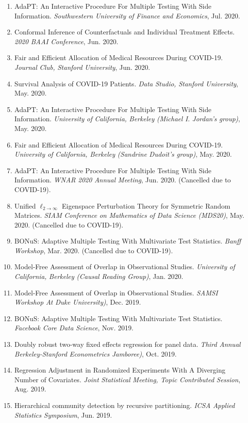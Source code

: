 \documentclass{article}
\begin{document}
\begin{enumerate}
\item AdaPT: An Interactive Procedure For Multiple Testing With Side Information. \emph{Southwestern University of Finance and Economics}, Jul. 2020. 
\item Conformal Inference of Counterfactuals and Individual Treatment Effects. \emph{2020 BAAI Conference}, Jun. 2020. 
\item Fair and Efficient Allocation of Medical Resources During COVID-19. \emph{Journal Club, Stanford University}, Jun. 2020.
\item Survival Analysis of COVID-19 Patients. \emph{Data Studio, Stanford University}, May. 2020.
\item AdaPT: An Interactive Procedure For Multiple Testing With Side Information. \emph{University of California, Berkeley (Michael I. Jordan's group)}, May. 2020. 
\item Fair and Efficient Allocation of Medical Resources During COVID-19. \emph{University of California, Berkeley (Sandrine Dudoit's group)}, May. 2020. 
\item AdaPT: An Interactive Procedure For Multiple Testing With Side Information. \emph{WNAR 2020 Annual Meeting}, Jun. 2020. (Cancelled due to COVID-19).
\item Unified $\ell_{2\rightarrow\infty}$ Eigenspace Perturbation Theory for Symmetric Random Matrices. \emph{SIAM Conference on Mathematics of Data Science (MDS20)}, May. 2020. (Cancelled due to COVID-19).
\item BONuS: Adaptive Multiple Testing With Multivariate Test Statistics. \emph{Banff Workshop}, Mar. 2020. (Cancelled due to COVID-19).
\item Model-Free Assessment of Overlap in Observational Studies. \emph{University of California, Berkeley (Causal Reading Group)}, Jan. 2020.
\item Model-Free Assessment of Overlap in Observational Studies. \emph{SAMSI Workshop At Duke University)}, Dec. 2019.
\item BONuS: Adaptive Multiple Testing With Multivariate Test Statistics. \emph{Facebook Core Data Science}, Nov. 2019.
\item Doubly robust two-way fixed effects regression for panel data. \emph{Third Annual Berkeley-Stanford Econometrics Jamboree)}, Oct. 2019.
\item Regression Adjustment in Randomized Experiments With A Diverging Number of Covariates. \emph{Joint Statistical Meeting, Topic Contributed Session}, Aug. 2019.
\item Hierarchical community detection by recursive partitioning. \emph{ICSA Applied Statistics Symposium}, Jun. 2019.

\end{enumerate}
\end{document}

